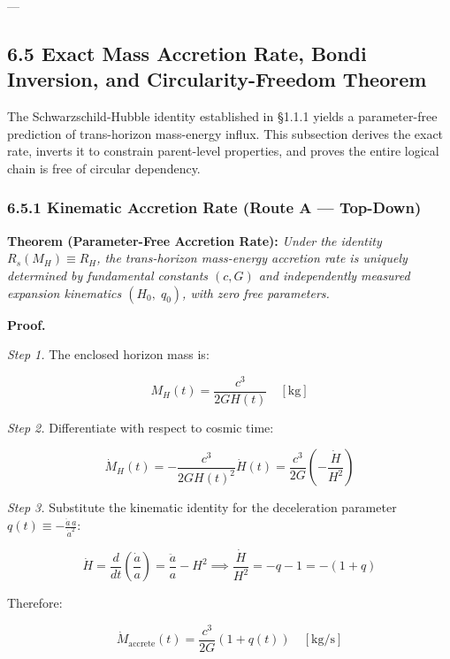 \documentclass[11pt,a4paper]{article}
\theoremstyle{definition}
\theoremstyle{remark}
\begin{document}
---

\subsection{6.5 Exact Mass Accretion Rate, Bondi Inversion, and Circularity-Freedom Theorem}

The Schwarzschild-Hubble identity established in \S 1.1.1 yields a parameter-free prediction of trans-horizon mass-energy influx. This subsection derives the exact rate, inverts it to constrain parent-level properties, and proves the entire logical chain is free of circular dependency.

\subsubsection{6.5.1 Kinematic Accretion Rate (Route A — Top-Down)}

\textbf{Theorem (Parameter-Free Accretion Rate):} \textit{Under the identity $R_s(M_H) \equiv R_H$, the trans-horizon mass-energy accretion rate is uniquely determined by fundamental constants $(c, G)$ and independently measured expansion kinematics $(H_0, \; q_0)$, with zero free parameters.}

\textbf{Proof.}

\textit{Step 1.} The enclosed horizon mass is:


\begin{equation}
M_H(t) = \frac{c^3}{2 G H(t)} \quad [\mathrm{kg}]
\end{equation}


\textit{Step 2.} Differentiate with respect to cosmic time:


\begin{equation}
\dot{M}_H(t) = -\frac{c^3}{2 G H(t)^2} \dot{H}(t) = \frac{c^3}{2G}\left(-\frac{\dot{H}}{H^2}\right)
\end{equation}


\textit{Step 3.} Substitute the kinematic identity for the deceleration parameter $q(t) \equiv -\frac{\ddot{a} \, a}{\dot{a}^2}$:


\begin{equation}
\dot{H} = \frac{d}{dt}\left(\frac{\dot{a}}{a}\right) = \frac{\ddot{a}}{a} - H^2 \implies \frac{\dot{H}}{H^2} = -q - 1 = -(1+q)
\end{equation}


Therefore:


\begin{equation}
\boxed{\dot{M}_{\text{accrete}}(t) = \frac{c^3}{2G}(1 + q(t)) \quad [\mathrm{kg/s}]}
\end{equation}
\end{document}
